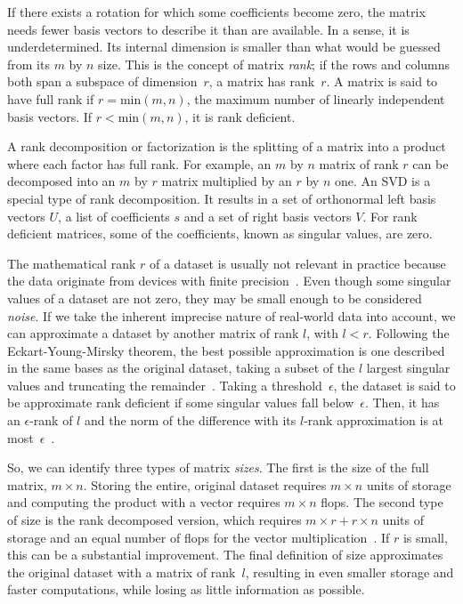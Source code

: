 \documentclass[ijgi,article,submit,moreauthors,pdftex,10pt,a4paper]{Definitions/mdpi}
\begin{document}
If there exists a rotation for which some coefficients become zero, the matrix needs fewer basis vectors to describe it than are available. In a sense, it is underdetermined. Its internal dimension is smaller than what would be guessed from its $m$ by $n$ size. This is the concept of matrix \textit{rank}; if the rows and columns both span a subspace of dimension~$r$, a matrix has rank~$r$. A matrix is said to have full rank if $r = \text{min}(m, n)$, the maximum number of linearly independent basis vectors. If $r < \text{min}(m, n)$, it is rank deficient.

A rank decomposition or factorization is the splitting of a matrix into a product where each factor has full rank. For example, an $m$ by $n$ matrix of rank $r$ can be decomposed into an $m$ by $r$ matrix multiplied by an $r$ by $n$ one. %
An SVD is a special type of rank decomposition. It results in a set of orthonormal left basis vectors $U$, a list of coefficients $s$ and a set of right basis vectors $V$. For rank deficient matrices, some of the coefficients, known as singular values, are zero.

The mathematical rank $r$ of a dataset is usually not relevant in practice because the data originate from devices with finite precision~\cite{Martinsson2016}. Even though some singular values of a dataset are not zero, they may be small enough to be considered \textit{noise}. If we take the inherent imprecise nature of real-world data into account, we can approximate a dataset by another matrix of rank $l$, with $l < r$. Following the Eckart-Young-Mirsky theorem, the best possible approximation is one described in the same bases as the original dataset, taking a subset of the $l$ largest singular values and truncating the remainder~\cite{Eckart1936}. Taking a threshold~$\epsilon$, the dataset is said to be approximate rank deficient if some singular values fall below~$\epsilon$. Then, it has an $\epsilon$-rank of $l$ and the norm of the difference with its $l$-rank approximation is at most~$\epsilon$~\cite{Martinsson2016}.

So, we can identify three types of matrix \textit{sizes}. The first is the size of the full matrix, $m \times n$. Storing the entire, original dataset requires $m \times n$ units of storage and computing the product with a vector requires $m \times n$ flops. The second type of size is the rank decomposed version, which requires $m \times r + r \times n$ units of storage and an equal number of flops for the vector multiplication~\cite{Martinsson2016}. If $r$ is small, this can be a substantial improvement. The final definition of size approximates the original dataset with a matrix of rank~$l$, resulting in even smaller storage and faster computations, while losing as little information as possible.
\end{document}
